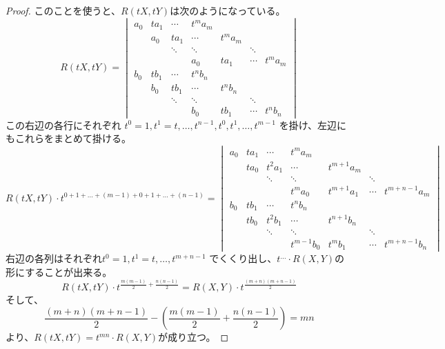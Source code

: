 \documentclass[a4paper]{jsarticle}
\begin{document}
\begin{proof}
        このことを使うと、$R(tX,tY)$は次のようになっている。
        \[
        R(tX,tY)=
        \begin{vmatrix}
            a_0&    ta_1&   \cdots&     t^m a_m \\
            {}&     a_0&    t a_1&      \cdots&     t^m a_m \\
            {}&     {}&     \ddots&     \ddots&     {}&     \ddots& \\
            {}&     {}&     {}&         a_0&        t a_1&  \cdots&    t^m a_m \\
            b_0&    t b_1&  \cdots&     t^n b_n \\
            {}&     b_0&    t b_1&      \cdots&     t^n b_n \\
            {}&     {}&     \ddots&     \ddots&     {}&     \ddots& \\
            {}&     {}&     {}&         b_0&        t b_1&  \cdots&    t^n b_n
        \end{vmatrix}
        \]
        この右辺の各行にそれぞれ
        $t^{0}=1, t^{1}=t, \dots, t^{n-1}, t^0, t^1, \dots, t^{m-1}$
        を掛け、左辺にもこれらをまとめて掛ける。
        \[
        R(tX,tY)\cdot t^{0+1+\dots+(m-1)+0+1+\dots+(n-1)}=
        \begin{vmatrix}
            a_0&    t a_1&  \cdots&     t^m a_m \\
            {}&     t a_0&  t^2 a_1&    \cdots&         t^{m+1} a_m \\
            {}&     {}&     \ddots&     \ddots&         {}&             \ddots& \\
            {}&     {}&     {}&         t^m a_0&        t^{m+1} a_1&    \cdots&    t^{m+n-1} a_m \\
            b_0&    t b_1&  \cdots&     t^n b_n \\
            {}&     t b_0&  t^2 b_1&    \cdots&         t^{n+1} b_n \\
            {}&     {}&     \ddots&     \ddots&         {}&             \ddots& \\
            {}&     {}&     {}&         t^{m-1} b_0&    t^m b_1&        \cdots&    t^{m+n-1} b_n
        \end{vmatrix}
        \]
        右辺の各列はそれぞれ$t^{0}=1, t^{1}=t, \dots, t^{m+n-1}$
        でくくり出し、$t^{\dots} \cdot R(X,Y)$の形にすることが出来る。
        \[
            R(tX,tY) \cdot t^{\frac{m(m-1)}{2}+\frac{n(n-1)}{2}}=R(X,Y) \cdot t^{\frac{(m+n)(m+n-1)}{2}}
        \]
        そして、
        \[
            \frac{(m+n)(m+n-1)}{2}-\left( \frac{m(m-1)}{2}+\frac{n(n-1)}{2} \right)=mn
        \]
        より、$R(tX,tY)=t^{mn} \cdot R(X,Y)$が成り立つ。

        
    \end{proof}
\end{document}
